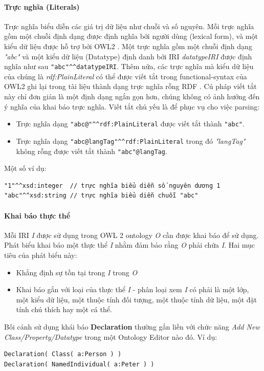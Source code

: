 \paragraph{Trực nghĩa (Literals)}
Trực nghĩa biểu diễn các giá trị dữ liệu như chuỗi và số nguyên. Mỗi trực nghĩa gồm một chuỗi định dạng được định nghĩa bới người dùng (lexical form), và một kiểu dữ liệu được hỗ trợ bởi OWL2 \cite{owl2spec} . Một trực nghĩa gồm một chuỗi định dạng \textit{"abc"} và một kiểu dữ liệu (Datatype) định danh bởi IRI \textit{datatypeIRI} được định nghĩa như sau \verb|"abc"^^datatypeIRI|. Thêm nữa, các trực nghĩa mà kiểu dữ liệu của chúng là \textit{rdf:PlainLiteral} có thể được viết tắt trong functional-syntax của OWL2 ghi lại trong tài liệu thành dạng trực nghĩa rỗng RDF \cite{rdf_concept}. Cú pháp viết tắt này chỉ đơn giản là một định dạng ngắn gọn hơn, chúng không có ảnh hưởng đến ý nghĩa của khai báo trực nghĩa. Viết tắt chủ yếu là để phục vụ cho việc parsing:
\begin{itemize}
	\item Trực nghĩa dạng \verb|"abc@"^^rdf:PlainLiteral| được viết tắt thành \verb|"abc"|.
	\item Trực nghĩa dạng \verb|"abc@langTag"^^rdf:PlainLiteral| trong đó \textit{"langTag"} không rỗng được viết tắt thành \verb|"abc"@langTag|.
\end{itemize}
Một số ví dụ:
\begin{verbatim}
"1"^^xsd:integer  // trực nghĩa biểu diễn số nguyên dương 1
"abc"^^xsd:string // trực nghĩa biểu diễn chuỗi "abc"
\end{verbatim}

\paragraph{Khai báo thực thể}
Mỗi IRI \textit{I} được sử dụng trong OWL 2 ontology \textit{O} cần được khai báo để sử dụng. Phát biểu khai báo một thực thể \textit{I} nhằm đảm bảo rằng \textit{O} phải chứa \textit{I}. Hai mục tiêu của phát biểu này:
\begin{itemize}
	\item Khẳng định sự tồn tại trong \textit{I} trong \textit{O}
	\item Khai báo gắn với loại của thực thể \textit{I} - phân loại xem \textit{I} có phải là một lớp, một kiểu dữ liệu, một thuộc tính đối tượng, một thuộc tính dữ liệu, một đặt tính chú thích hay một cá thể.
\end{itemize}
Bối cảnh sử dụng khái báo \textbf{Declaration} thường gắn liền với chức năng \textit{Add New Class/Property/Datatype} trong một Ontology Editor nào đó. Ví dụ:
\begin{verbatim}
Declaration( Class( a:Person ) )
Declaration( NamedIndividual( a:Peter ) )
\end{verbatim}

